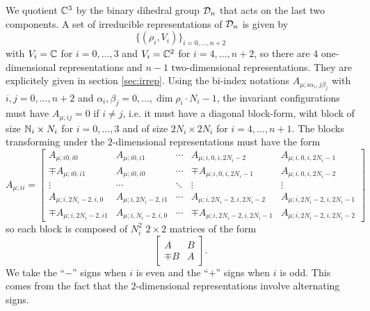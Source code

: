         We quotient $\mathbb{C}^3$ by the binary dihedral group $\mathcal{D}_n$ that acts on the last two components. A set of irreducible representations of $\mathcal{D}_n$ is given by
        \begin{equation}
            \{(\rho_i,V_i)\}_{i=0,\dots,n+2}
        \end{equation}
        with $V_i=\mathbb{C}$ for $i=0,\dots,3$ and $V_i=\mathbb{C}^2$ for $i=4,\dots,n+2$, so there are $4$ one-dimensional representations and $n-1$ two-dimensional representations. They are explicitely given in section \ref{sec:irrep}. Using the bi-index notations $A_{\mu;i\alpha_i,j\beta_j}$ with $i,j=0,\dots,n+2$ and $\alpha_i,\beta_j=0,\dots,\dim\rho_i\cdot N_i-1$, the invariant configurations must have $A_{\mu;ij}=0$ if $i\neq j$, i.e. it must have a diagonal block-form, wiht block of size $\mathbb{N}_i\times N_i$ for $i=0,\dots,3$ and of size $2N_i\times 2N_i$ for $i=4,\dots,n+1$. The blocks transforming under the $2$-dimensional representations must have the form
        \begin{equation}
            A_{\mu;ii}=
            \begin{bmatrix}
                A_{\mu;i0,i0} & A_{\mu;i0,i1} & \cdots & A_{\mu;i,0,i,2N_i-2} & A_{\mu;i,0,i,2N_i-1} \\ 
                \mp A_{\mu;i0,i1} & A_{\mu;i0,i0} & \cdots & \mp A_{\mu;i,0,i,2N_i-1} & A_{\mu;i,0,i,2N_i-2} \\
                \vdots & \cdots & \ddots & \vdots & \vdots \\
                A_{\mu;i,2N_i-2,i,0} & A_{\mu;i,2N_i-2,i1} & \cdots & A_{\mu;i,2N_i-2,i,2N_i-2} & A_{\mu;i,2N_i-2,i,2N_i-1} \\ 
                \mp A_{\mu;i,2N_i-2,i1} & A_{\mu;i,N_i-2,i,0} & \cdots & \mp  A_{\mu;i,2N_i-2,i,2N_i-1} & A_{\mu;i,2N_i-2,i,2N_i-2}
            \end{bmatrix}
        \end{equation}
        so each block is composed of $N^2_i$ $2\times2$ matrices of the form
        \begin{equation}
            \begin{bmatrix}
                A & B \\
                \mp B & A
            \end{bmatrix}.
        \end{equation}
        We take the ``$-$'' signs when $i$ is even and the ``$+$'' signs when $i$ is odd. This comes from the fact that the $2$-dimensional representations involve alternating signs.

